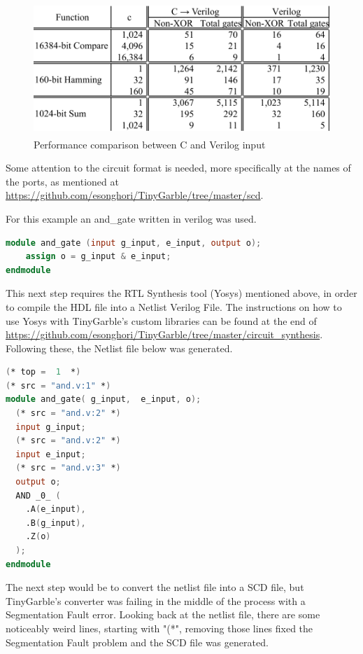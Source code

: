 \begin{refsection}
\begin{figure}[H]
	\centering
	\includegraphics[width=1\textwidth, height=5cm]{./sdf/secure_multiparty_computation/figures/tiny_garble_CvsHDL.png}
    \caption{Performance comparison between C and Verilog input\cite{Songhori}}\label{fig:tinygarble_comparison}
\end{figure}

\newpage
 
Some attention to the circuit format is needed, more specifically at the names of the ports, as mentioned at \url{https://github.com/esonghori/TinyGarble/tree/master/scd}.

For this example an and\_gate written in verilog was used.

\begin{lstlisting}[caption={and\_gate.v}, language=Verilog] 
module and_gate (input g_input, e_input, output o);
	assign o = g_input & e_input;
endmodule
\end{lstlisting}

This next step requires the RTL Synthesis tool (Yosys) mentioned above, in order to compile the HDL file into a Netlist Verilog File. The instructions on how to use Yosys with TinyGarble's custom libraries can be found at the end of \url{https://github.com/esonghori/TinyGarble/tree/master/circuit\_synthesis}.
Following these, the Netlist file below was generated.

\begin{lstlisting}[caption={and\_gate\_netlist.v}, language=Verilog] 
(* top =  1  *)
(* src = "and.v:1" *)
module and_gate( g_input,  e_input, o);
  (* src = "and.v:2" *)
  input g_input;
  (* src = "and.v:2" *)
  input e_input;
  (* src = "and.v:3" *)
  output o;
  AND _0_ (
    .A(e_input),
    .B(g_input),
    .Z(o)
  );
endmodule
\end{lstlisting}

The next step would be to convert the netlist file into a SCD file, but TinyGarble's converter was failing in the middle of the process with a Segmentation Fault error.
Looking back at the netlist file, there are some noticeably weird lines, starting with "(*", removing those lines fixed the Segmentation Fault problem and the SCD file was generated.


\end{refsection}
